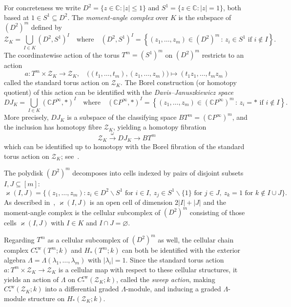 \documentclass[a4paper,10pt]{amsart}
\theoremstyle{definition}
\theoremstyle{remark}
\begin{document}
For concreteness we write $D^2=\{z\in\mathbb{C} : |z| \leqslant 1\}$ and $S^1=\{z\in\mathbb{C} : |z| = 1\}$, both based at $1\in S^1\subseteq D^2$. The \emph{moment-angle complex} over $K$ is the subspace of $(D^2)^m$ defined by
\[
\mathcal{Z}_K = \bigcup_{I\in K} (D^2,S^1)^I\quad\text{where}\quad (D^2,S^1)^I=\left\{ (z_1,\ldots,z_m)\in (D^2)^m \,:\, z_i\in S^1\text{ if }i\notin I\right\}.
\]
The coordinatewise action of the torus $T^m=(S^1)^m$ on $(D^2)^m$ restricts to an action
\[
a\colon T^m\times\mathcal{Z}_K \to \mathcal{Z}_K, \quad \big((t_1,\ldots,t_m),(z_1,\ldots,z_m)\big) \mapsto (t_1z_1,\ldots,t_mz_m)
\]
called the standard torus action on $\mathcal{Z}_K$. The Borel construction (or homotopy quotient) of this action can be identified with the \emph{Davis--Januszkiewicz space}
\[
DJ_K = \bigcup_{I\in K} (\mathbb{C}P^\infty,*)^I\quad\text{where}\quad (\mathbb{C}P^\infty,*)^I=\left\{ (z_1,\ldots,z_m)\in (\mathbb{C}P^\infty)^m \,:\, z_i=*\text{ if }i\notin I\right\}.
\]
More precisely, $DJ_K$ is a subspace of the classifying space $BT^m=(\mathbb{C}P^\infty)^m$, and the inclusion has homotopy fibre $\mathcal{Z}_K$, yielding a homotopy fibration
\begin{equation} \label{fib}
\mathcal{Z}_K \stackrel{\omega}{\longrightarrow} DJ_K \longrightarrow BT^m
\end{equation}
which can be identified up to homotopy with the Borel fibration of the standard torus action on $\mathcal{Z}_K$; see~\cite[Theorem~4.3.2]{BP}.

The polydisk $(D^2)^m$ decomposes into cells indexed by pairs of disjoint subsets $I,J\subseteq [m]$:
\[
\varkappa(I,J) = \big\{ (z_1,\ldots,z_m) : z_i\in D^2\smallsetminus S^1 \text{ for } i\in 
I,\  z_j\in S^1\smallsetminus\{1\}\text{ for } j\in J,\ 
z_k=1 \text{ for } k\notin I\cup J \big\}.
\]
As described in~\cite[\S 4.4]{BP}, $\varkappa(I,J)$ is an open cell of dimension $2|I|+|J|$ and the moment-angle complex is the cellular subcomplex of $(D^2)^m$ consisting of those cells $\varkappa(I,J)$ with $I\in K$ and $I\cap J=\varnothing$.

Regarding $T^m$ as a cellular subcomplex of $(D^2)^m$ as well, the cellular chain complex $C_*^\mathrm{cw}(T^m;k)$ and $H_*(T^m;k)$ can both be identified with the exterior algebra $\Lambda=\Lambda(\lambda_1,\ldots,\lambda_m)$ with $|\lambda_i|=1$. Since the standard torus action $a\colon T^m\times\mathcal{Z}_K \to \mathcal{Z}_K$ is a cellular map with respect to these cellular structures, it yields an action of $\Lambda$ on $C_*^\mathrm{cw}(\mathcal{Z}_K;k)$, called the \emph{sweep action}, making $C_*^\mathrm{cw}(\mathcal{Z}_K;k)$ into a differential graded $\Lambda$-module, and inducing a graded $\Lambda$-module structure on $H_*(\mathcal{Z}_K;k)$.
\end{document}
